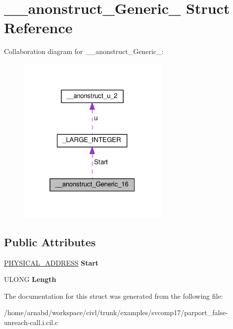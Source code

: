 \hypertarget{struct____anonstruct__Generic__16}{}\section{\+\_\+\+\_\+anonstruct\+\_\+\+Generic\+\_ Struct Reference}
\label{struct____anonstruct__Generic__16}


Collaboration diagram for \+\_\+\+\_\+anonstruct\+\_\+\+Generic\+\_\+:
\nopagebreak
\begin{figure}[H]
\begin{center}
\leavevmode
\includegraphics[width=208pt]{struct____anonstruct__Generic__16__coll__graph}
\end{center}
\end{figure}
\subsection*{Public Attributes}
\begin{DoxyCompactItemize}
\item 
\hypertarget{struct____anonstruct__Generic__16_a3ba34cdfe101694c357f53bca5d93db1}{}\hyperlink{union__LARGE__INTEGER}{P\+H\+Y\+S\+I\+C\+A\+L\+\_\+\+A\+D\+D\+R\+E\+S\+S} {\bfseries Start}\label{struct____anonstruct__Generic__16_a3ba34cdfe101694c357f53bca5d93db1}

\item 
\hypertarget{struct____anonstruct__Generic__16_a93f9d231393b0a8183f5f20c23f69147}{}U\+L\+O\+N\+G {\bfseries Length}\label{struct____anonstruct__Generic__16_a93f9d231393b0a8183f5f20c23f69147}

\end{DoxyCompactItemize}


The documentation for this struct was generated from the following file\+:\begin{DoxyCompactItemize}
\item 
/home/arnabd/workspace/civl/trunk/examples/svcomp17/parport\+\_\+false-\/unreach-\/call.\+i.\+cil.\+c\end{DoxyCompactItemize}
